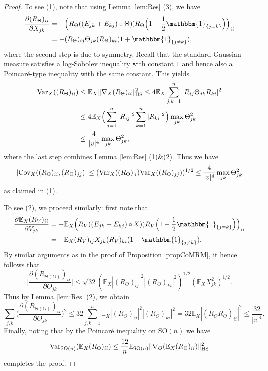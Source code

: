 \documentclass[a4paper,12pt]{amsart}
\numberwithin{equation}{section}
\theoremstyle{remark}
\def\E{{\mathbb E}}
\def\Var{{\rm Var}}
\begin{document}
\begin{proof}
To see (1), note that using Lemma \ref{lem:Res} (3), we have
\begin{align*}
\frac{\partial (R_\Theta)_{ii}}{\partial X_{jk}} &= -\Big(R_\Theta ((E_{jk} + E_{kj})\circ \Theta)) R_\Theta \Big(1 - \frac{1}{2}\mathbbm{1}_{\{j=k\}}\Big)\Big)_{ii} \\
&= - (R_\Theta)_{ij} \Theta_{jk} (R_\Theta)_{ki}(1 +\mathbbm{1}_{\{j\ne k\}}),
\end{align*}
where the second step is due to symmetry. Recall that the standard Gaussian measure satisfies a log-Sobolev inequality with constant $1$ and hence also a Poincar\'{e}-type inequality with the same constant. This yields
\begin{align*}
\Var_X((R_\Theta)_{ii})  &\le  \E_X \lVert\nabla_X  (R_\Theta)_{ii}\rVert_{\mathrm{HS}}^2 \le 4\E_X \sum_{j,k=1}^n |R_{ij} \Theta_{jk} R_{ki}|^2\\
&\le 4 \E_X \Big(\sum_{j=1}^n |R_{ij}|^2 \sum_{k=1}^n |R_{ki}|^2\Big)\max_{jk}\Theta_{jk}^2 \\
&\le \frac {4} {|v|^4 } \max_{jk}\Theta_{jk}^2,
\end{align*}
where the last step combines Lemma \ref{lem:Res} (1)\&(2). Thus we have
\begin{equation*}
|\mathrm{Cov}_X((R_\Theta)_{ii}, (R_\Theta)_{jj})| \le (\Var_X((R_\Theta)_{ii})\Var_X((R_\Theta)_{jj}))^{1/2} \le \frac{4}{ |v|^4}\max_{jk}\Theta_{jk}^2
\end{equation*}
as claimed in (1).

To see (2), we proceed similarly: first note that
\begin{align*}
\frac{\partial \E_X (R_V)_{ii}}{\partial V_{jk}} &= -\E_X  \Big(R_V ((E_{jk} + E_{kj})\circ X)) R_V \Big(1 - \frac{1}{2}\mathbbm{1}_{\{j=k\}}\Big)\Big)_{ii}\\
&= - \E_X (R_V)_{ij} X_{jk} (R_V)_{ki}(1 +\mathbbm{1}_{\{j\ne k\}}).
\end{align*}
By similar arguments as in the proof of Proposition \ref{propCoMRM}, it hence follows that
\begin{equation*}
\Big|\frac{\partial (R_{\Theta(O)})_{ii}}{\partial O_{jk}}\Big| \le \sqrt{32} (\E_X |(R_{\Theta})_{ij}|^2 |(R_{\Theta})_{ki}|^2)^{1/2} (\E_X X_{jk}^2)^{1/2}.
\end{equation*}
Thus by Lemma \ref{lem:Res} (2), we obtain
\begin{equation*}
	\sum_{j,k} \Big(\frac{\partial (R_{\Theta(O)})_{ii}}{\partial O_{jk}}\Big)^2 \le 32 \sum_{j,k=1}^n \E_X |(R_{\Theta})_{ij}|^2|(R_{\Theta})_{ki}|^2 = 32 \E_X |(R_{\Theta}\bar{R_{\Theta}})_{ii}|^2 \le \frac{32}{|v|^4}.
\end{equation*}
Finally, noting that by the Poincar\'{e} inequality on $\mathrm{SO}(n)$ we have
\[
\Var_{\mathrm{SO}(n)}(\E_X (R_\Theta)_{ii}) \le \frac{12}{n} \E_{\mathrm{SO}(n)} \lVert \nabla_O (\E_X (R_\Theta)_{ii}) \rVert_\mathrm{HS}^2
\]
completes the proof.
\end{proof}
\end{document}
